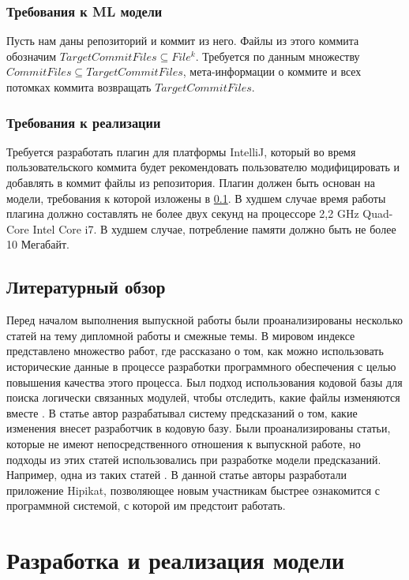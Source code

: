 \documentclass[times]{itmo-student-thesis}
\begin{document}
\subsection{Требования к ML модели}\label{ml-model-req}
Пусть нам даны репозиторий и коммит из него. Файлы из этого коммита обозначим $TargetCommitFiles \subseteq File^k$. Требуется по данным множеству $CommitFiles \subseteq TargetCommitFiles$, мета-информации о коммите и всех потомках коммита возвращать $TargetCommitFiles$.
\subsection{Требования к реализации}
Требуется разработать плагин для платформы IntelliJ, который во время пользовательского коммита будет рекомендовать пользователю модифицировать и добавлять в коммит файлы из репозитория. Плагин должен быть основан на модели, требования к которой изложены в \ref{ml-model-req}. В худшем случае время работы плагина должно составлять не более двух секунд на процессоре 2,2 GHz Quad-Core Intel Core i7. В худшем случае, потребление памяти должно быть не более 10 Мегабайт.
\section{Литературный обзор}
Перед началом выполнения выпускной работы были проанализированы несколько статей на тему дипломной работы и смежные темы. В мировом индексе представлено множество работ, где рассказано о том, как можно использовать исторические данные в процессе разработки программного обеспечения с целью повышения качества этого процесса. Был подход использования кодовой базы для поиска логически связанных модулей, чтобы отследить, какие файлы изменяются вместе \cite{logical-modules}. В статье \cite{source-change} автор разрабатывал систему предсказаний о том, какие изменения внесет разработчик в кодовую базу. Были проанализированы статьи, которые не имеют непосредственного отношения к выпускной работе, но подходы из этих статей использовались при разработке модели предсказаний. Например, одна из таких статей \cite{project-memory}. В данной статье авторы разработали приложение Hipikat, позволяющее новым участникам быстрее ознакомится с программной системой, с которой им предстоит работать.






\chapter{Разработка и реализация модели}
\end{document}

